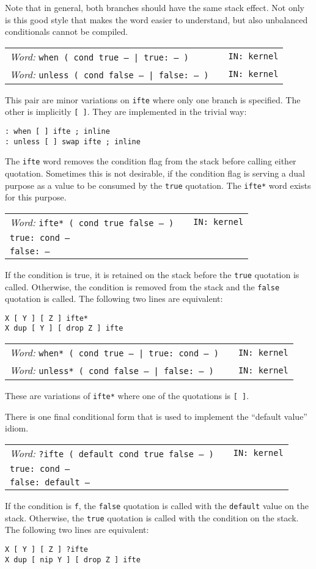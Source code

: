 \documentclass{report}
\newcommand{\ordinaryword}[3]{\index{#1}
\emph{Word:} \texttt{#2} &&\texttt{IN: #3}}
\newcommand{\wordtable}[1]{

\begin{tabularx}{12cm}[t]{lXr}
\hline
#1\\
\hline
\end{tabularx}

}
\begin{document}
Note that in general, both branches should have the same stack effect. Not only is this good style that makes the word easier to understand, but also unbalanced conditionals cannot be compiled.
\wordtable{
\ordinaryword{when}{when ( cond true -- | true:~-- )}{kernel}\\
\ordinaryword{unless}{unless ( cond false -- | false:~-- )}{kernel}
}
This pair are minor variations on \texttt{ifte} where only one branch is specified. The other is implicitly \texttt{[ ]}. They are implemented in the trivial way:
\begin{verbatim}
: when [ ] ifte ; inline
: unless [ ] swap ifte ; inline
\end{verbatim}
The \texttt{ifte} word removes the condition flag from the stack before calling either quotation. Sometimes this is not desirable, if the condition flag is serving a dual purpose as a value to be consumed by the \texttt{true} quotation. The \texttt{ifte*} word exists for this purpose.
\wordtable{
\ordinaryword{ifte*}{ifte*~( cond true false -- )}{kernel}\\
\texttt{true:~cond --}\\
\texttt{false:~--}
}
If the condition is true, it is retained on the stack before the \texttt{true} quotation is called. Otherwise, the condition is removed from the stack and the \texttt{false} quotation is called. The following two lines are equivalent:
\begin{verbatim}
X [ Y ] [ Z ] ifte*
X dup [ Y ] [ drop Z ] ifte
\end{verbatim}
\wordtable{
\ordinaryword{when*}{when*~( cond true -- | true:~cond -- )}{kernel}\\
\ordinaryword{unless*}{unless*~( cond false -- | false:~-- )}{kernel}
}
These are variations of \texttt{ifte*} where one of the quotations is \texttt{[ ]}.

There is one final conditional form that is used to implement the ``default value'' idiom.
\wordtable{
\ordinaryword{?ifte}{?ifte ( default cond true false -- )}{kernel}\\
\texttt{true:~cond --}\\
\texttt{false:~default --}
}
If the condition is \texttt{f}, the \texttt{false} quotation is called with the \texttt{default} value on the stack. Otherwise, the \texttt{true} quotation is called with the condition on the stack. The following two lines are equivalent:
\begin{verbatim}
X [ Y ] [ Z ] ?ifte
X dup [ nip Y ] [ drop Z ] ifte
\end{verbatim}
\end{document}
